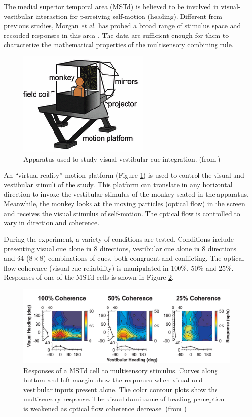 \documentclass{article}[11pt]
\newcommand{\etal}{\textit{et al. }}
\begin{document}
The medial superior temporal area (MSTd) is believed to be involved in visual-vestibular interaction for perceiving self-motion (heading). Different from previous studies, Morgan \etal has probed a broad range of stimulus space and recorded responses in this area \cite{morgan_multisensory_2008}. The data are sufficient enough for them to characterize the mathematical properties of the multisensory combining rule.

\begin{figure}[tpbh]
  \centering
  \includegraphics[scale=.6]{apparatus}
  \caption{Apparatus used to study visual-vestibular cue integration. (from \cite{fetsch_visualvestibular_2010})}
  \label{fig:apparatus}
\end{figure}

An ``virtual reality'' motion platform (Figure \ref{fig:apparatus}) is used to control the visual and vestibular stimuli of the study. 
This platform can translate in any horizontal direction to invoke the vestibular stimulus of the monkey seated in the apparatus. Meanwhile, the monkey looks at the moving particles (optical flow) in the screen and receives the visual stimulus of self-motion. The optical flow is controlled to vary in direction and coherence.

During the experiment, a variety of conditions are tested. Conditions include presenting visual cue alone in 8 directions, vestibular cue alone in 8 directions and 64 ($8 \times 8$) combinations of cues, both congruent and conflicting. The optical flow coherence (visual cue reliability) is manipulated in $100\%$, $50\%$ and $25\%$. Responses of one of the MSTd cells is shown in Figure \ref{fig:coherence}.

\begin{figure}[btph]
  \centering
  \includegraphics[width=\textwidth]{coherence}
  \caption{Responses of a MSTd cell to multisensory stimulus. Curves along bottom and left margin show the responses when visual and vestibular inputs present alone. The color contour plots show the multisensory response. The visual dominance of heading perception is weakened as optical flow coherence decrease. (from \cite{morgan_multisensory_2008})}
  \label{fig:coherence}
\end{figure}
\end{document}
